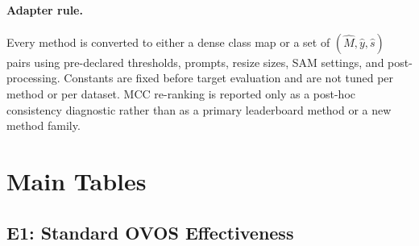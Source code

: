 \documentclass[11pt,a4paper]{article}
\begin{document}
\paragraph{Adapter rule.}
Every method is converted to either a dense class map or a set of $(\hat{M},\hat{y},\hat{s})$ pairs using pre-declared thresholds, prompts, resize sizes, SAM settings, and post-processing. Constants are fixed before target evaluation and are not tuned per method or per dataset. MCC re-ranking is reported only as a post-hoc consistency diagnostic rather than as a primary leaderboard method or a new method family.


\section{Main Tables}

\subsection{E1: Standard OVOS Effectiveness}
\end{document}
